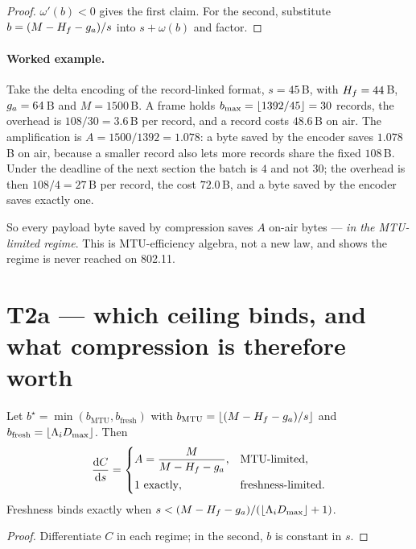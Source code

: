 \begin{proof}
$\omega'(b) < 0$ gives the first claim. For the second, substitute $b = (M - H_f - g_a)/s$ into
$s + \omega(b)$ and factor.
\end{proof}

\paragraph{Worked example.} Take the delta encoding of the record-linked format, $s = 45$\,B, with
$H_f = 44$\,B, $g_a = 64$\,B and $M = 1500$\,B. A frame holds
$b_{\max} = \lfloor 1392/45 \rfloor = 30$ records, the overhead is $108/30 = 3.6$\,B per record,
and a record costs $48.6$\,B on air. The amplification is $A = 1500/1392 = 1.078$: a byte
saved by the encoder saves $1.078$\,B on air, because a smaller record also lets more records
share the fixed $108$\,B. Under the deadline of the next section the batch is $4$ and not
$30$; the overhead is then $108/4 = 27$\,B per record, the cost $72.0$\,B, and a byte saved by
the encoder saves exactly one.

So every payload byte saved by compression saves $A$ on-air bytes --- \emph{in the MTU-limited
regime}. This is MTU-efficiency algebra, not a new law, and  shows the regime is
never reached on 802.11.

\section{T2a --- which ceiling binds, and what compression is therefore worth}

\begin{theorem}\label{thm:t2a}
Let $b^\star = \min(b_{\mathrm{MTU}}, b_{\mathrm{fresh}})$ with
$b_{\mathrm{MTU}} = \lfloor (M - H_f - g_a)/s \rfloor$ and
$b_{\mathrm{fresh}} = \lfloor \Lambda_i D_{\max} \rfloor$. Then
\[
\frac{\mathrm{d}C}{\mathrm{d}s} =
\begin{cases}
A = \dfrac{M}{M - H_f - g_a}, & \text{MTU-limited},\\[2ex]
1 \ \text{exactly}, & \text{freshness-limited}.
\end{cases}
\]
Freshness binds exactly when $s < (M - H_f - g_a)/(\lfloor \Lambda_i D_{\max} \rfloor + 1)$.
\end{theorem}

\begin{proof}
Differentiate $C$ in each regime; in the second, $b$ is constant in $s$.
\end{proof}

